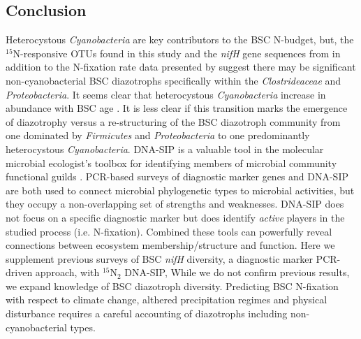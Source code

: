 %
\subsection{Conclusion}
Heterocystous \textit{Cyanobacteria} are key contributors to the BSC N-budget,
but, the $^{15}$N-responsive OTUs found in this study and the \textit{nifH}
gene sequences from \citet{Steppe_1996} in addition to the N-fixation rate data
presented by \citet{15643930} suggest there may be significant
non-cyanobacterial BSC diazotrophs specifically within the
\textit{Clostrideaceae} and \textit{Proteobacteria}. It seems clear that
heterocystous \textit{Cyanobacteria} increase in abundance with BSC age
\citep{14766579}. It is less clear if this transition marks the emergence of
diazotrophy versus a re-structuring of the BSC diazotroph community from one
dominated by \textit{Firmicutes} and \textit{Proteobacteria} to one
predominantly heterocystous \textit{Cyanobacteria}. DNA-SIP is a valuable tool
in the molecular microbial ecologist's toolbox for identifying members of
microbial community functional guilds \citep{17446886}. PCR-based surveys of
diagnostic marker genes and DNA-SIP are both used to connect microbial
phylogenetic types to microbial activities, but they occupy a non-overlapping
set of strengths and weaknesses. DNA-SIP does not focus on a specific diagnostic
marker but does identify \textit{active} players in the studied process (i.e. 
N-fixation). Combined these tools can powerfully reveal connections between
ecosystem membership/structure and function. Here we supplement previous
surveys of BSC \textit{nifH} diversity, a diagnostic marker PCR-driven
approach, with $^{15}$N$_{2}$ DNA-SIP, While we do not confirm previous
results, we expand knowledge of BSC diazotroph diversity.  Predicting BSC
N-fixation with respect to climate change, althered precipitation regimes and
physical disturbance requires a careful accounting of diazotrophs including
non-cyanobacterial types. 
